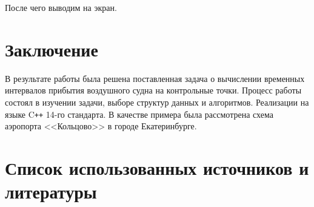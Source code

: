 \documentclass[12pt, a4 paper]{article}
\theoremstyle{plain}
\begin{document}
После чего выводим на экран.

\newpage

\section*{Заключение}

В результате работы была решена поставленная задача о вычислении временных интервалов прибытия воздушного судна на контрольные точки. Процесс работы состоял в изучении задачи, выборе структур данных и алгоритмов. Реализации на языке C{}\verb!++! 14-го стандарта. В качестве примера была рассмотрена схема аэропорта <<Кольцово>> в городе Екатеринбурге.

\newpage

\section*{Список использованных источников и литературы}
\end{document}
